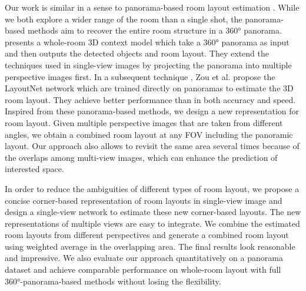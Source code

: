 %
Our work is similar in a sense to panorama-based room layout estimation \cite{zhang2014panocontext,zou2018layoutnet}. While we both explore a wider range of the room than a single shot, the panorama-based methods aim to recover the entire room structure in a \ang{360} panorama. 
%
\cite{zhang2014panocontext} presents a whole-room 3D context model which take a \ang{360} panorama as input and then outputs the detected objects and room layout. 
They extend the techniques used in single-view images by projecting the panorama into multiple perspective images first. 
In a subsequent technique \cite{zou2018layoutnet}, Zou et al. propose the LayoutNet network which are trained directly on panoramas to estimate the 3D room layout. They achieve better performance than \cite{zhang2014panocontext} in both accuracy and speed.
%
Inspired from these panorama-based methods, we design a new representation for room layout. Given multiple perspective images that are taken from different angles, we obtain a combined room layout at any FOV including the panoramic layout. Our approach also allows to revisit the same area several times because of the overlaps among multi-view images, which can enhance the prediction of interested space.

%
In order to reduce the ambiguities of different types of room layout, we propose a concise corner-based representation of room layouts in single-view image and design a single-view network to estimate these new corner-based layouts. 
The new representations of multiple views are easy to integrate.
We combine the estimated room layouts from different perspectives and generate a combined room layout using weighted average in the overlapping area. 
The final results look reasonable and impressive. 
We also evaluate our approach quantitatively on a panorama dataset and achieve comparable performance on whole-room layout with full \ang{360}-panorama-based methods without losing the flexibility.   

